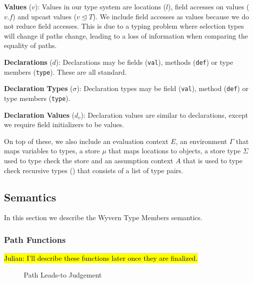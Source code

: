 \documentclass{llncs}
\numberwithin{subcase}{casethm}
\numberwithin{casethm}{theorem}
\numberwithin{casethm}{lemma}
\begin{document}
\textbf{Values} ($v$): Values in our type system are locations ($l$), 
field accesses on values ($v.f$) and upcast values ($v \unlhd T$). We 
include field accesses as values because we do not reduce field accesses. 
This is due to a typing problem where selection types will change 
if paths change, leading to a loss of information when comparing the 
equality of paths.

\textbf{Declarations} ($d$): Declarations may be fields (\texttt{val}), 
methods (\texttt{def}) or type members (\texttt{type}). These are all
standard.

\textbf{Declaration Types} ($\sigma$): Declaration types may be field 
(\texttt{val}), method (\texttt{def}) or type members (\texttt{type}). 

\textbf{Declaration Values} ($d_v$): Declaration values are similar to 
declarations, except we require field initializers to be values.

On top of these, we also include an evaluation context $E$, an environment 
$\Gamma$ that maps variables to types, a store $\mu$ that maps locations 
to objects, a store type $\Sigma$ used to type check the store and an 
assumption context $A$ that is used to type check recursive types (\cite{Amber Rules etc})
that consists of a list of type pairs.



\subsection{Semantics}
In this section we describe the Wyvern Type Members semantics.
\subsubsection{Path Functions}

\hl{Julian: I'll describe these functions later once they are finalized.}

\begin{figure}[h]
\hfill {}
\hfill {}
\caption{Path Leads-to Judgement}
\label{f:path}
\end{figure}
\end{document}
